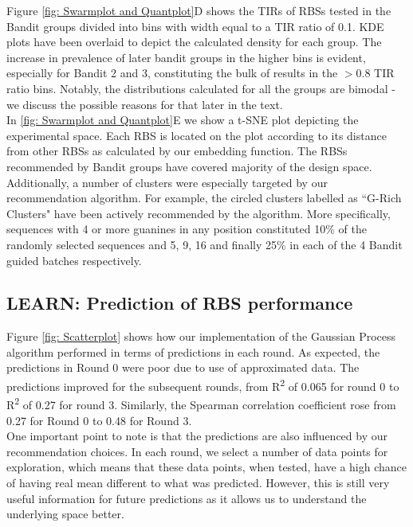 \documentclass{article}
\begin{document}
Figure \ref{fig: Swarmplot and Quantplot}D shows the TIRs of RBSs tested in the Bandit groups divided into bins with width equal to a TIR ratio of 0.1.
KDE plots have been overlaid to depict the calculated density for each group.
The increase in prevalence of later bandit groups in the higher bins is evident, especially for Bandit 2 and 3, constituting the bulk of results in the $>0.8$ TIR ratio bins.
Notably, the distributions calculated for all the groups are bimodal - we discuss the possible reasons for that later in the text.\\

In \ref{fig: Swarmplot and Quantplot}E we show a t-SNE plot depicting the experimental space.
Each RBS is located on the plot according to its distance from other RBSs as calculated by our embedding function.
The RBSs recommended by Bandit groups have covered majority of the design space. 
Additionally, a number of clusters were especially targeted by our recommendation algorithm.
For example, the circled clusters labelled as ``G-Rich Clusters" have been actively recommended by the algorithm.
More specifically, sequences with 4 or more guanines in any position constituted 10\% of the randomly selected sequences and 5, 9, 16 and finally 25\% in each of the 4 Bandit guided batches respectively.

\subsection{LEARN: Prediction of RBS performance}
\label{sec:gp-results}

Figure \ref{fig: Scatterplot} shows how our implementation of the Gaussian Process algorithm performed in terms of predictions in each round. 
As expected, the predictions in Round 0 were poor due to use of approximated data. 
The predictions improved for the subsequent rounds, from R\textsuperscript{2} of 0.065 for round 0 to R\textsuperscript{2} of 0.27 for round 3.
Similarly, the Spearman correlation coefficient rose from 0.27 for Round 0 to 0.48 for Round 3.\\

One important point to note is that the predictions are also influenced by our recommendation choices. 
In each round, we select a number of data points for exploration, which means that these data points, when tested, have a high chance of having real mean different to what was predicted.
However, this is still very useful information for future predictions as it allows us to understand the underlying space better.\\
\end{document}
